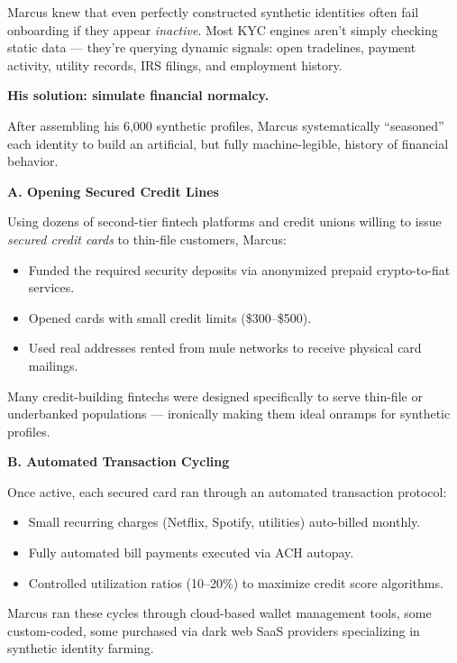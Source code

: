 Marcus knew that even perfectly constructed synthetic identities often fail onboarding if they appear \emph{inactive}. Most KYC engines aren’t simply checking static data — they’re querying dynamic signals: open tradelines, payment activity, utility records, IRS filings, and employment history.

\medskip

\textbf{His solution: simulate financial normalcy.}

After assembling his 6,000 synthetic profiles, Marcus systematically ``seasoned'' each identity to build an artificial, but fully machine-legible, history of financial behavior.

\medskip

\textbf{A. Opening Secured Credit Lines}

Using dozens of second-tier fintech platforms and credit unions willing to issue \emph{secured credit cards} to thin-file customers, Marcus:

\begin{itemize}
    \item Funded the required security deposits via anonymized prepaid crypto-to-fiat services.
    \item Opened cards with small credit limits (\$300--\$500).
    \item Used real addresses rented from mule networks to receive physical card mailings.
\end{itemize}

Many credit-building fintechs were designed specifically to serve thin-file or underbanked populations --- ironically making them ideal onramps for synthetic profiles.

\medskip

\textbf{B. Automated Transaction Cycling}

Once active, each secured card ran through an automated transaction protocol:

\begin{itemize}
    \item Small recurring charges (Netflix, Spotify, utilities) auto-billed monthly.
    \item Fully automated bill payments executed via ACH autopay.
    \item Controlled utilization ratios (10--20\%) to maximize credit score algorithms.
\end{itemize}

Marcus ran these cycles through cloud-based wallet management tools, some custom-coded, some purchased via dark web SaaS providers specializing in synthetic identity farming.

